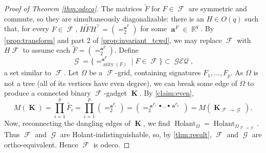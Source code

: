 \documentclass{article}
\DeclareMathOperator{\rr}{\mathbb{R}}
\DeclareMathOperator{\arity}{arity}
\DeclareMathOperator{\vk}{\mathbf{K}}
\DeclareMathOperator{\va}{\mathbf{a}}
\DeclareMathOperator{\fc}{\mathcal{F}}
\DeclareMathOperator{\gc}{\mathcal{G}}
\DeclareMathOperator{\holant}{Holant}
\DeclareMathOperator{\geneq}{\mathcal{GEQ}}
\begin{document}
\begin{proof}[Proof of Theorem \ref{thm:odeco}]
    The matrices $\widetilde{F}$ for $F \in \fc$ are symmetric and commute, so they are simultaneously diagonalizable:
    there is an $H \in O(q)$ such that, for every $F \in \fc$, $H\widetilde{F}H^\top = (=_2^{\va^F})$ 
    for some $\va^F \in \rr^{q}$.
    By \autoref{prop:transform} and part 2 of \autoref{prop:invariant_tcwd},
    we may replace $\fc$ with $H\fc$ to assume each $\widetilde{F} = (=_2^{\va^F})$. Define
    \[
       \gc = \{=_{\arity(F)}^{\va^F} \mid F \in \fc\} \subset \geneq,
    \]
    a set similar to $\fc$.
    Let $\Omega$ be a $\fc$-grid,
    containing signatures $F_1,\ldots,F_p$.
    As $\Omega$ is not a tree (all of its vertices have even degree), we can break some edge of $\Omega$
    to produce a connected binary $\fc$-gadget $\vk$. By \autoref{claim:even},
    \[
        M(\vk) = \prod_{i=1}^{p} \widetilde{F_i} = \prod_{i=1}^{p}(=_2^{\va^{F_i}})
        = \left(=_2^{\va^{F_1} \bullet \ldots \bullet \va^{F_p}}\right) = M(\vk_{\fc\to\gc}).
    \]
    Now, reconnecting the dangling edges of $\vk$, we find $\holant_{\Omega} = 
    \holant_{\Omega_{\fc\to\gc}}$. Thus $\fc$ and $\gc$ are Holant-indistinguishable, so, by
    \autoref{thm:result}, $\fc$ and $\gc$ are ortho-equivalent. Hence $\fc$ is odeco.


\end{proof}
\end{document}
